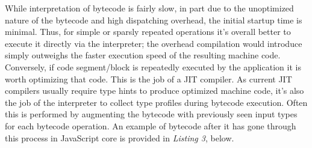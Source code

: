 \noindent
While interpretation of bytecode is fairly slow, in part due to the unoptimized nature of the bytecode
and high dispatching overhead, the initial startup time is minimal. Thus, for simple or sparsly repeated
operations it's overall better to execute it directly via the interpreter; the overhead compilation
would introduce simply outweighs the faster execution speed of the resulting machine code. Conversely,
if code segment/block is repeatedly executed by the application it is worth optimizing that code. This is
the job of a JIT compiler. As current JIT compilers usually require type hints to produce optimized machine
code, it's also the job of the interpreter to collect type profiles during bytecode execution. Often this
is performed by augmenting the bytecode with previously seen input types for each bytecode operation. An
example of bytecode after it has gone through this process in JavaScript core is provided in 
\textit{Listing 3}, below.

